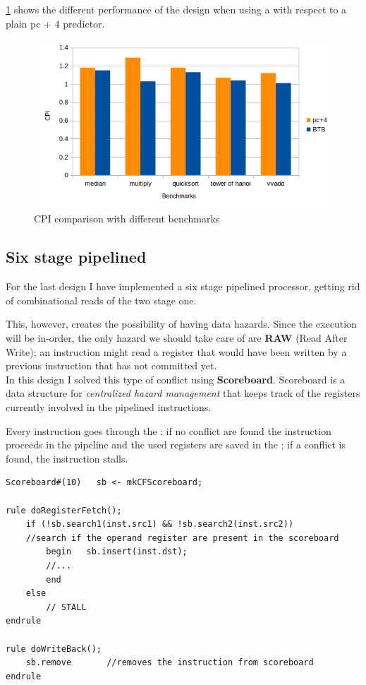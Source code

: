 \documentclass[12pt,oneside,a4paper]{article}
\begin{document}
\cref{btbbench} shows the different performance of the design when using a {\selectfont{BTB}} with respect to a plain pc + 4 predictor.

\begin{figure}[h]
	\centering
	\includegraphics[scale=0.7]{predbtb}
	\caption{CPI comparison with different benchmarks}
	\label{btbbench}
\end{figure}

\subsection{Six stage pipelined}
For the last design I have implemented a six stage pipelined processor, getting rid of combinational reads of the two stage one.

This, however, creates the possibility of having data hazards. Since the execution will be in-order, the only hazard we should take care of are \textbf{RAW} (Read After Write); an instruction might read a register that would have been written by a previous instruction that has not committed yet.\\

In this design I solved this type of conflict using \textbf{Scoreboard}. 
Scoreboard is a data structure for \textit{centralized hazard management} that keeps track of the registers currently involved in the pipelined instructions. 

Every instruction goes through the {\selectfont{scoreboard}}: if no conflict are found the instruction proceeds in the pipeline and the used registers are saved in the  {\selectfont{scoreboard}}; if a conflict is found, the instruction stalls.

\begin{lstlisting}[label={fourcyclecode},caption={Scoreboard integration in the pipeline}]
Scoreboard#(10)   sb <- mkCFScoreboard;

rule doRegisterFetch();      
	if (!sb.search1(inst.src1) && !sb.search2(inst.src2))	
	//search if the operand register are present in the scoreboard
		begin	sb.insert(inst.dst);	
		//...
		end
	else
		// STALL
endrule

rule doWriteBack();
	sb.remove		//removes the instruction from scoreboard
endrule
\end{lstlisting}
\end{document}
